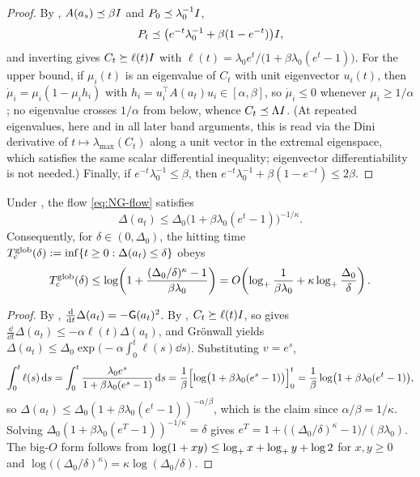 \begin{proof}
By , $A(a_s)\preceq\beta I$ and $P_0\preceq\lambda_0^{-1}I$,
\[
    P_t\preceq\bigl(e^{-t}\lambda_0^{-1}+\beta(1-e^{-t})\bigr)I ,
\]
and inverting gives $C_t\succeq\ell(t)I$ with
$\ell(t)=\lambda_0e^t/\bigl(1+\beta\lambda_0(e^t-1)\bigr)$. For the upper bound, if $\mu_i(t)$ is
an eigenvalue of $C_t$ with unit eigenvector $u_i(t)$, then $\dot\mu_i=\mu_i(1-\mu_ih_i)$ with
$h_i=u_i^\top A(a_t)u_i\in[\alpha,\beta]$, so $\dot\mu_i\leq0$ whenever $\mu_i\geq1/\alpha$; no
eigenvalue crosses $1/\alpha$ from below, whence $C_t\preceq\Lambda I$. (At repeated eigenvalues,
here and in all later band arguments, this is read via the Dini derivative of
$t\mapsto\lambda_{\max}(C_t)$ along a unit vector in the extremal eigenspace, which satisfies the
same scalar differential inequality; eigenvector differentiability is not needed.) Finally, if
$e^{-t}\lambda_0^{-1}\leq\beta$, then $e^{-t}\lambda_0^{-1}+\beta(1-e^{-t})\leq2\beta$.
\end{proof}

\begin{theorem}
\label{thm:cont-global}
Under , the flow \eqref{eq:NG-flow} satisfies
\[
    \boxed{\;
    \Delta(a_t)\leq\Delta_0\bigl(1+\beta\lambda_0(e^t-1)\bigr)^{-1/\kappa}.
    \;}
\]
Consequently, for $\delta\in(0,\Delta_0)$, the hitting time
$T_{\mathrm c}^{\mathrm{glob}}(\delta):=\inf\{t\geq0:\Delta(a_t)\leq\delta\}$ obeys
\[
    T_{\mathrm c}^{\mathrm{glob}}(\delta)
    \leq\log\!\left(1+\frac{(\Delta_0/\delta)^{\kappa}-1}{\beta\lambda_0}\right)
    =O\!\left(\log_+\frac1{\beta\lambda_0}+\kappa\log_+\frac{\Delta_0}{\delta}\right).
\]
\end{theorem}

\begin{proof}
By , $\tfrac{\mathrm{d}}{\mathrm{d} t}\Delta(a_t)=-\mathsf{G}(a_t)^2$. By
, $C_t\succeq\ell(t)I$, so  gives
$\tfrac{\dd}{\dd t}\Delta(a_t)\leq-\alpha\ell(t)\Delta(a_t)$, and Gr\"onwall yields
$\Delta(a_t)\leq\Delta_0\exp\bigl(-\alpha\int_0^t\ell(s)\dd s\bigr)$. Substituting $v=e^s$,
\[
    \int_0^t\ell(s)\,\mathrm{d} s
    =\int_0^t\frac{\lambda_0e^s}{1+\beta\lambda_0(e^s-1)}\,\mathrm{d} s
    =\frac1\beta\Bigl[\log\bigl(1+\beta\lambda_0(e^s-1)\bigr)\Bigr]_0^t
    =\frac1\beta\log\bigl(1+\beta\lambda_0(e^t-1)\bigr),
\]
so $\Delta(a_t)\leq\Delta_0(1+\beta\lambda_0(e^t-1))^{-\alpha/\beta}$, which is the claim since
$\alpha/\beta=1/\kappa$. Solving
$\Delta_0(1+\beta\lambda_0(e^T-1))^{-1/\kappa}=\delta$ gives
$e^T=1+\bigl((\Delta_0/\delta)^\kappa-1\bigr)/(\beta\lambda_0)$. The big-$O$ form follows from
$\log(1+xy)\leq\log_+ x+\log_+ y+\log2$ for $x,y\geq0$ and
$\log\bigl((\Delta_0/\delta)^\kappa\bigr)=\kappa\log(\Delta_0/\delta)$.
\end{proof}

